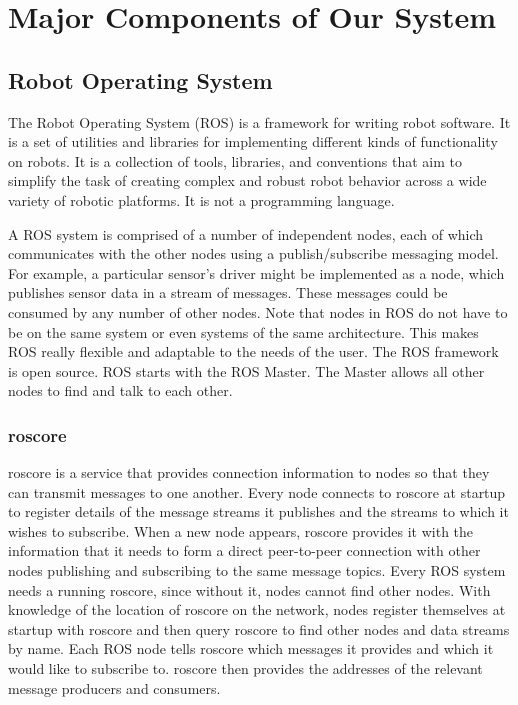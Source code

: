\documentclass[journal]{IEEEtran}
\begin{document}
\section{Major Components of Our System}

\subsection{Robot Operating System}
The Robot Operating System (ROS) is a framework for writing robot software. It is a set of utilities and libraries for implementing different kinds of functionality on robots. It is a collection of tools, libraries, and conventions that aim to simplify the task of creating complex and robust robot behavior across a wide variety of robotic platforms. It is not a programming language. 

A ROS system is comprised of a number of independent nodes, each of which communicates with the other nodes using a publish/subscribe messaging model. For example, a particular sensor’s driver might be implemented as a node, which publishes sensor data in a stream of messages. These messages could be consumed by any number of other nodes.
Note that nodes in ROS do not have to be on the same system or even systems of the same architecture. This makes ROS really flexible and adaptable to the needs of the user. The ROS framework is open source.
ROS starts with the ROS Master. The Master allows all other nodes to find and talk to each other. 

\subsubsection{roscore}
roscore is a service that provides connection information to nodes so that they can
transmit messages to one another. Every node connects to roscore at startup to register
details of the message streams it publishes and the streams to which it wishes to subscribe.
When a new node appears, roscore provides it with the information that it needs to form a
direct peer-to-peer connection with other nodes publishing and subscribing to the same
message topics. Every ROS system needs a running roscore, since without it, nodes
cannot find other nodes.
With knowledge of the location of roscore on the network, nodes register themselves at
startup with roscore and then query roscore to find other nodes and data streams by
name. Each ROS node tells roscore which messages it provides and which it would like
to subscribe to. roscore then provides the addresses of the relevant message producers
and consumers.
\end{document}
